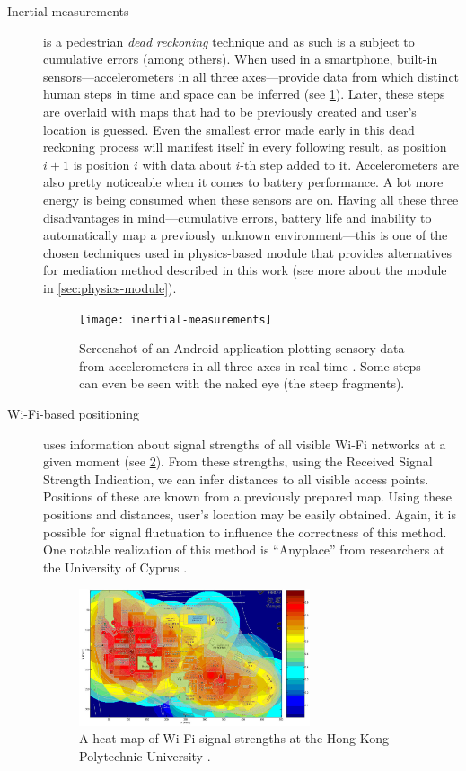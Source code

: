 \begin{description}
	\item[Inertial measurements] is a pedestrian \emph{dead reckoning} technique and as such is a subject to cumulative errors (among others). When used in a smartphone, built-in sensors---accelerometers in all three axes---provide data from which distinct human steps in time and space can be inferred (see \cref{fig:inertial-measurements}). Later, these steps are overlaid with maps that had to be previously created and user's location is guessed. Even the smallest error made early in this dead reckoning process will manifest itself in every following result, as position $i+1$ is position $i$ with data about $i$-th step added to it. Accelerometers are also pretty noticeable when it comes to battery performance. A lot more energy is being consumed when these sensors are on. Having all these three disadvantages in mind---cumulative errors, battery life and inability to automatically map a previously unknown environment---this is one of the chosen techniques used in physics-based module that provides alternatives for mediation method described in this work (see more about the module in \cref{sec:physics-module}).
	
	\begin{figure}[h]
		\centering
		\texttt{[image: inertial-measurements]}
		\caption{Screenshot of an Android application plotting sensory data from accelerometers in all three axes in real time \cite{google-play:accelerometer}. Some steps can even be seen with the naked eye (the steep fragments).}
		\label{fig:inertial-measurements}
	\end{figure}
	
	\item[Wi-Fi-based positioning] uses information about signal strengths of all visible Wi-Fi networks at a given moment (see \cref{fig:wifi-positioning}). From these strengths, using the Received Signal Strength Indication, we can infer distances to all visible access points. Positions of these are known from a previously prepared map. Using these positions and distances, user's location may be easily obtained. Again, it is possible for signal fluctuation to influence the correctness of this method. One notable realization of this method is ``Anyplace'' from researchers at the University of Cyprus \cite{Anyplace}.
	
	\begin{figure}[h]
		\centering
		\includegraphics[width=0.67\textwidth]{wifi-positioning}
		\caption{A heat map of Wi-Fi signal strengths at the Hong Kong Polytechnic University \cite{hk:wifi-positioning}.}
		\label{fig:wifi-positioning}
	\end{figure}
	

\end{description}
